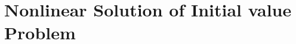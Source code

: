 \documentclass[12pt]{report}   %
\begin{document}

%
\clearpage{\pagestyle{empty}\cleardoublepage}

\chapter{Nonlinear Solution of Initial value Problem}
\end{document}
